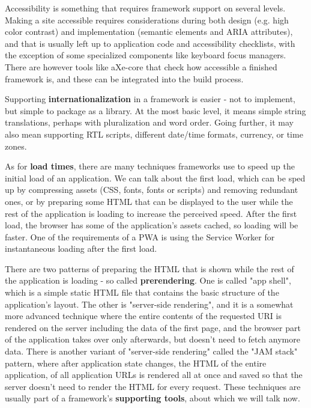 \documentclass[english,odsaz]{fitthesis}
\begin{document}
Accessibility is something that requires framework support on several
levels. Making a site accessible requires considerations during both design
(e.g. high color contrast) and implementation (semantic elements and ARIA
attributes), and that is usually left up to application code and accessibility
checklists, with the exception of some specialized components like keyboard
focus managers. There are however tools like aXe-core that check how accessible
a finished framework is, and these can be integrated into the build process.

Supporting \textbf{internationalization} in a framework is easier - not to implement, but
simple to package as a library. At the most basic level, it means simple string
translations, perhaps with pluralization and word order. Going further, it may
also mean supporting RTL scripts, different date/time formats, currency, or time
zones.

As for \textbf{load times}, there are many techniques frameworks use to speed up the
initial load of an application. We can talk about the first load, which can be
sped up by compressing assets (CSS, fonts, fonts or scripts) and removing
redundant ones, or by preparing some HTML that can be displayed to the user
while the rest of the application is loading to increase the perceived
speed. After the first load, the browser has some of the application's assets
cached, so loading will be faster. One of the requirements of a PWA is using the
Service Worker for instantaneous loading after the first load.

There are two patterns of preparing the HTML that is shown while the rest of the
application is loading - so called \textbf{prerendering}. One is called "app shell",
which is a simple static HTML file that contains the basic structure of the
application's layout. The other is "server-side rendering", and it is a somewhat
more advanced technique where the entire contents of the requested URI is
rendered on the server including the data of the first page, and the browser
part of the application takes over only afterwards, but doesn't need to fetch
anymore data. There is another variant of "server-side rendering" called the
"JAM stack" pattern, where after application state changes, the HTML of the
entire application, of all application URLs is rendered all at once and saved so
that the server doesn't need to render the HTML for every request. These
techniques are usually part of a framework's \textbf{supporting tools}, about which we
will talk now.
\end{document}
